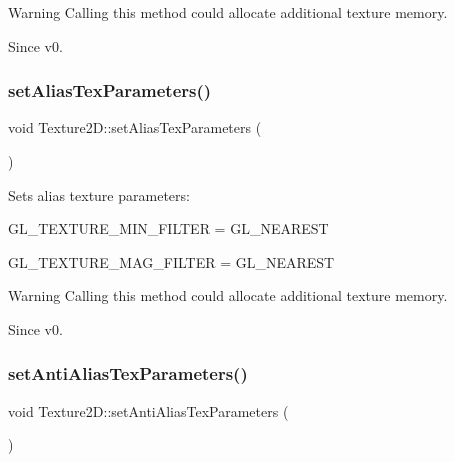 \begin{DoxyWarning}{Warning}
Calling this method could allocate additional texture memory.
\end{DoxyWarning}
\begin{DoxySince}{Since}
v0. 
\end{DoxySince}
\mbox{\label{classTexture2D_affbb5fcc6fee13cfab17dada97d59904}} 
\subsubsection{\texorpdfstring{set\+Alias\+Tex\+Parameters()}{setAliasTexParameters()}\hspace{0.1cm}{\footnotesize\ttfamily [2/2]}}
{\footnotesize\ttfamily void Texture2\+D\+::set\+Alias\+Tex\+Parameters (\begin{DoxyParamCaption}{ }\end{DoxyParamCaption})}

Sets alias texture parameters\+:
\begin{DoxyItemize}
\item G\+L\+\_\+\+T\+E\+X\+T\+U\+R\+E\+\_\+\+M\+I\+N\+\_\+\+F\+I\+L\+T\+ER = G\+L\+\_\+\+N\+E\+A\+R\+E\+ST
\item G\+L\+\_\+\+T\+E\+X\+T\+U\+R\+E\+\_\+\+M\+A\+G\+\_\+\+F\+I\+L\+T\+ER = G\+L\+\_\+\+N\+E\+A\+R\+E\+ST
\end{DoxyItemize}

\begin{DoxyWarning}{Warning}
Calling this method could allocate additional texture memory.
\end{DoxyWarning}
\begin{DoxySince}{Since}
v0. 
\end{DoxySince}
\mbox{\label{classTexture2D_a2b9bc7bc273b0793c6b58010c55724e6}} 
\subsubsection{\texorpdfstring{set\+Anti\+Alias\+Tex\+Parameters()}{setAntiAliasTexParameters()}\hspace{0.1cm}{\footnotesize\ttfamily [1/2]}}
{\footnotesize\ttfamily void Texture2\+D\+::set\+Anti\+Alias\+Tex\+Parameters (\begin{DoxyParamCaption}{ }\end{DoxyParamCaption})}

